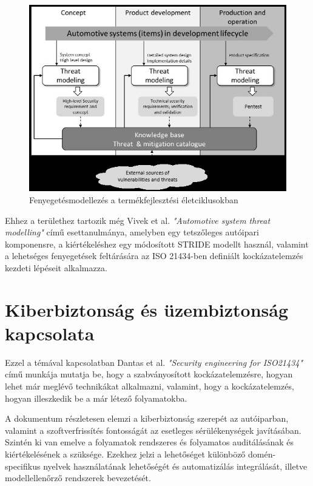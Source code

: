 \begin{figure}[!ht]
\centering
\includegraphics[width=125mm, keepaspectratio]{figures/03_MA.png}
\caption{Fenyegetésmodellezés a termékfejlesztési életciklusokban\cite{Ma}}
\label{fig:MA}
\end{figure}

Ehhez a területhez tartozik még Vivek et al.\cite{Vivek} \textit{"Automotive system threat modelling"} című esettanulmánya, amelyben egy tetszőleges autóipari komponensre,  a kiértékeléshez egy módosított STRIDE modellt használ, valamint a lehetséges fenyegetések feltárására az ISO 21434-ben definiált kockázatelemzés kezdeti lépéseit alkalmazza.

\section{Kiberbiztonság és üzembiztonság kapcsolata}

Ezzel a témával kapcsolatban Dantas et al. \cite{Dantas} \textit{"Security engineering for ISO21434"} című munkája mutatja be, hogy a szabványosított kockázatelemzésre, hogyan lehet már meglévő technikákat alkalmazni, valamint, hogy a kockázatelemzés, hogyan illeszkedik be a már létező folyamatokba. 

A dokumentum részletesen elemzi a kiberbiztonság szerepét az autóiparban, valamint a szoftverfrissítés fontosságát az esetleges sérülékenységek javításában. Szintén ki van emelve a folyamatok rendszeres és folyamatos auditálásának és kiértékelésének a szüksége. Ezekhez jelzi a lehetőséget különböző domén-specifikus nyelvek használatának lehetőségét és automatizálás integrálását, illetve modellellenőrző rendszerek bevezetését. 

